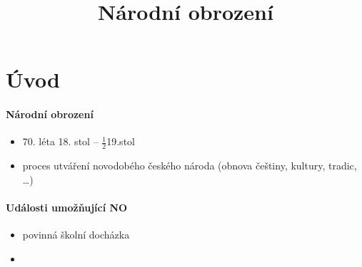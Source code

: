 \title{Národní obrození}


\section{Úvod}
\paragraph{Národní obrození}
\begin{itemize}
\item 70. léta 18. stol -- $\frac{1}{2}$19.stol
\item proces utváření novodobého českého národa (obnova češtiny, kultury, tradic, \ldots)
\end{itemize}
\paragraph{Události umožňující NO}
\begin{itemize}
\item povinná školní docházka
\item 
\end{itemize}
